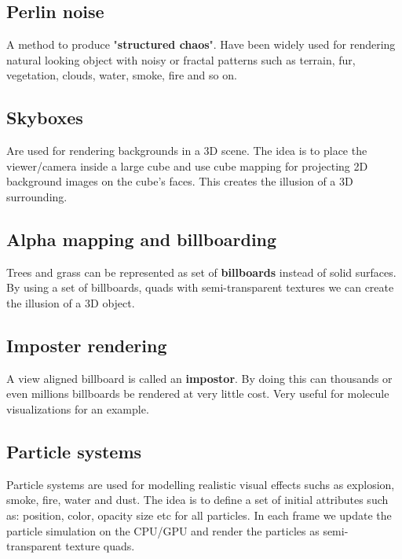 	 \subsection*{Perlin noise}
	 A method to produce "\textbf{structured chaos}". Have been widely used for rendering natural looking object with noisy or fractal patterns such as terrain, fur, vegetation, clouds, water, smoke, fire and so on. 


	 \subsection*{Skyboxes}
	 Are used for rendering backgrounds in a 3D scene. The idea is to place the viewer/camera inside a large cube and use cube mapping for projecting 2D background images on the cube's faces. This creates the illusion of a 3D surrounding. 


	 \subsection*{Alpha mapping and billboarding}
	 Trees and grass can be represented as set of \textbf{billboards} instead of solid surfaces. By using a set of billboards, quads with semi-transparent textures we can create the illusion of a 3D object.


	 \subsection*{Imposter rendering}
	 A view aligned billboard is called an \textbf{impostor}. By doing this can thousands or even millions billboards be rendered at very little cost. Very useful for molecule visualizations for an example. 

	 \subsection*{Particle systems}
	 Particle systems are used for modelling realistic visual effects suchs as explosion, smoke, fire, water and dust. The idea is to define a set of initial attributes such as: position, color, opacity size etc for all particles. In each frame we update the particle simulation on the CPU/GPU and render the particles as semi-transparent texture quads.  








